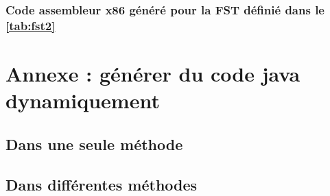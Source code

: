 \clearpage
\subsubsection{Code assembleur x86 généré pour la FST définié dans le \autoref{tab:fst2}}



\clearpage

\section{Annexe : générer du code java dynamiquement}

\subsection{Dans une seule méthode}

\subsection{Dans différentes méthodes}


